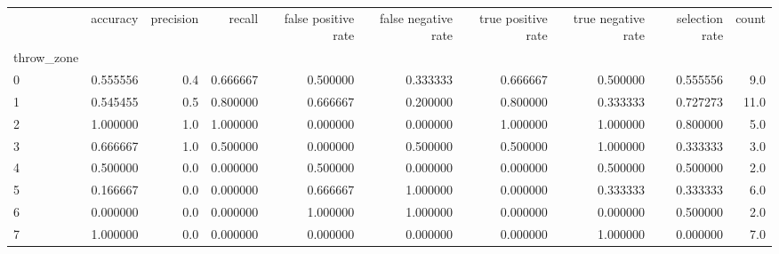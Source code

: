 \begin{tabular}{lrrrrrrrrr}
\toprule
{} &  accuracy &  precision &    recall &  false positive rate &  false negative rate &  true positive rate &  true negative rate &  selection rate &  count \\
throw\_zone &           &            &           &                      &                      &                     &                     &                 &        \\
\midrule
0          &  0.555556 &        0.4 &  0.666667 &             0.500000 &             0.333333 &            0.666667 &            0.500000 &        0.555556 &    9.0 \\
1          &  0.545455 &        0.5 &  0.800000 &             0.666667 &             0.200000 &            0.800000 &            0.333333 &        0.727273 &   11.0 \\
2          &  1.000000 &        1.0 &  1.000000 &             0.000000 &             0.000000 &            1.000000 &            1.000000 &        0.800000 &    5.0 \\
3          &  0.666667 &        1.0 &  0.500000 &             0.000000 &             0.500000 &            0.500000 &            1.000000 &        0.333333 &    3.0 \\
4          &  0.500000 &        0.0 &  0.000000 &             0.500000 &             0.000000 &            0.000000 &            0.500000 &        0.500000 &    2.0 \\
5          &  0.166667 &        0.0 &  0.000000 &             0.666667 &             1.000000 &            0.000000 &            0.333333 &        0.333333 &    6.0 \\
6          &  0.000000 &        0.0 &  0.000000 &             1.000000 &             1.000000 &            0.000000 &            0.000000 &        0.500000 &    2.0 \\
7          &  1.000000 &        0.0 &  0.000000 &             0.000000 &             0.000000 &            0.000000 &            1.000000 &        0.000000 &    7.0 \\
\bottomrule
\end{tabular}

